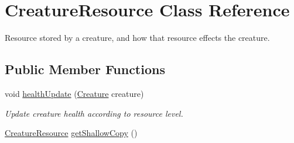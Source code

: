\hypertarget{class_creature_resource}{}\section{Creature\+Resource Class Reference}
\label{class_creature_resource}


Resource stored by a creature, and how that resource effects the creature.  


\subsection*{Public Member Functions}
\begin{DoxyCompactItemize}
\item 
void \mbox{\hyperlink{class_creature_resource_ae5678920b5302ad56650bdaec0fde5e5}{health\+Update}} (\mbox{\hyperlink{class_creature}{Creature}} creature)
\begin{DoxyCompactList}\small\item\em Update creature health according to resource level. \end{DoxyCompactList}\item 
\mbox{\hyperlink{class_creature_resource}{Creature\+Resource}} \mbox{\hyperlink{class_creature_resource_a994286201a611ddfada1fced56e427e7}{get\+Shallow\+Copy}} ()
\end{DoxyCompactItemize}
